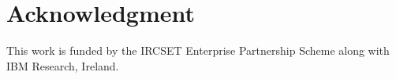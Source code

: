 \documentclass[conference]{IEEEtran}
\begin{document}
\section*{Acknowledgment}
This work is funded by the IRCSET Enterprise Partnership Scheme along with IBM Research, Ireland.



%
%
%



\end{document}
